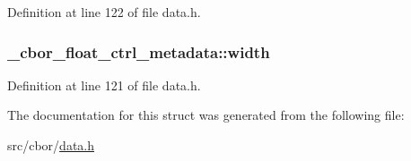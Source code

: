 Definition at line 122 of file data.\-h.

\hypertarget{struct__cbor__float__ctrl__metadata_a19a1c5e96c662dd4781f0172052b194c}{
\subsubsection[{width}]{ \-\_\-cbor\-\_\-float\-\_\-ctrl\-\_\-metadata\-::width}}\label{struct__cbor__float__ctrl__metadata_a19a1c5e96c662dd4781f0172052b194c}


Definition at line 121 of file data.\-h.



The documentation for this struct was generated from the following file\-:\begin{DoxyCompactItemize}
\item 
src/cbor/\hyperlink{data_8h}{data.\-h}\end{DoxyCompactItemize}
